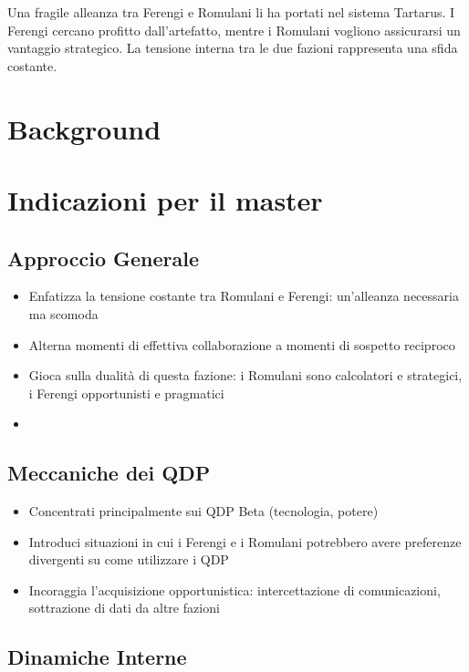 \documentclass[letterpaper,twocolumn,openany,nodeprecatedcode]{dndbook}
\begin{document}
Una fragile alleanza tra Ferengi e Romulani li ha portati nel sistema Tartarus. I Ferengi cercano profitto dall'artefatto, mentre i Romulani vogliono assicurarsi un vantaggio strategico. La tensione interna tra le due fazioni rappresenta una sfida costante.

\section{Background}

\section {Indicazioni per il master}

\subsection{Approccio Generale}

\begin{itemize}
    \item Enfatizza la tensione costante tra Romulani e Ferengi: un'alleanza necessaria ma scomoda
    \item Alterna momenti di effettiva collaborazione a momenti di sospetto reciproco
    \item Gioca sulla dualità di questa fazione: i Romulani sono calcolatori e strategici, i Ferengi opportunisti e pragmatici
    \item 
\end{itemize}
\subsection{Meccaniche dei QDP}

\begin{itemize}
    \item Concentrati principalmente sui QDP Beta (tecnologia, potere)
    \item Introduci situazioni in cui i Ferengi e i Romulani potrebbero avere preferenze divergenti su come utilizzare i QDP
    \item Incoraggia l'acquisizione opportunistica: intercettazione di comunicazioni, sottrazione di dati da altre fazioni
\end{itemize}

\subsection{Dinamiche Interne}
\end{document}
